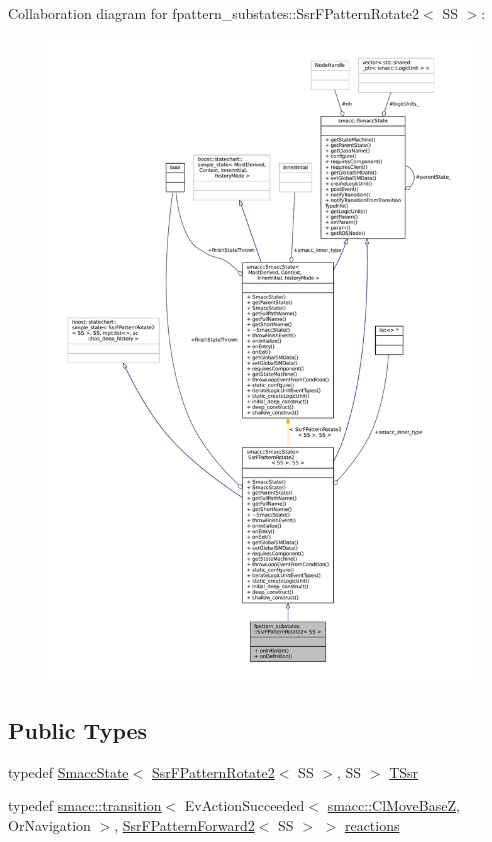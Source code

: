 Collaboration diagram for fpattern\+\_\+substates\+:\+:Ssr\+F\+Pattern\+Rotate2$<$ SS $>$\+:
\nopagebreak
\begin{figure}[H]
\begin{center}
\leavevmode
\includegraphics[width=350pt]{structfpattern__substates_1_1SsrFPatternRotate2__coll__graph}
\end{center}
\end{figure}
\subsection*{Public Types}
\begin{DoxyCompactItemize}
\item 
typedef \hyperlink{classSmaccState}{Smacc\+State}$<$ \hyperlink{structfpattern__substates_1_1SsrFPatternRotate2}{Ssr\+F\+Pattern\+Rotate2}$<$ SS $>$, SS $>$ \hyperlink{structfpattern__substates_1_1SsrFPatternRotate2_aec44e099cf2e57b8cd9c6f2ee2562e4a}{T\+Ssr}
\item 
typedef \hyperlink{classsmacc_1_1transition}{smacc\+::transition}$<$ Ev\+Action\+Succeeded$<$ \hyperlink{classsmacc_1_1ClMoveBaseZ}{smacc\+::\+Cl\+Move\+BaseZ}, Or\+Navigation $>$, \hyperlink{structfpattern__substates_1_1SsrFPatternForward2}{Ssr\+F\+Pattern\+Forward2}$<$ SS $>$ $>$ \hyperlink{structfpattern__substates_1_1SsrFPatternRotate2_a2e76850207998fffed0d3fc9fc636cf2}{reactions}
\end{DoxyCompactItemize}
